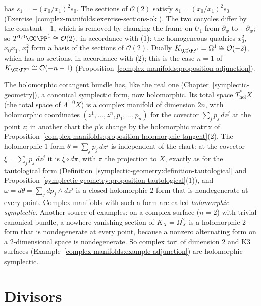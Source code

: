 \begin{example}
\begin{enumerate}
has $s_1 = -(x_0/x_1)^2s_0$. The sections of $\mathcal{O}(2)$ satisfy $s_1 = (x_0/x_1)^2s_0$ (Exercise~\ref{complex-manifolds:exercise-sections-ok}). The two cocycles differ by the constant $-1$, which is
removed by changing the frame on $U_1$ from $\partial_w$ to $-\partial_w$; so $T^{1,0}\CC\PP^1 \cong \mathcal{O}(2)$, in accordance with (1): the homogeneous quadrics $x_0^2$, $x_0x_1$, $x_1^2$ form a basis of
the sections of $\mathcal{O}(2)$. Dually $K_{\CC\PP^1} = \Omega^1 \cong \mathcal{O}(-2)$, which has no sections, in accordance with (2); this is the case $n = 1$ of $K_{\CC\PP^n} \cong \mathcal{O}(-n-1)$
(Proposition~\ref{complex-manifolds:proposition-adjunction}).
\end{enumerate}
\end{example}

\begin{remark}\label{complex-manifolds:remark-holomorphic-symplectic}
The holomorphic cotangent bundle has, like the real one (Chapter~\ref{symplectic-geometry}), a canonical symplectic form, now holomorphic. Its total space $T^*_{\mathrm{hol}}X$ (the total space of $\Lambda^{1,0}X$) is a complex
manifold of dimension $2n$, with holomorphic coordinates $(z^1, \ldots, z^n, p_1, \ldots, p_n)$ for the covector $\sum_jp_j\,dz^j$ at the point $z$; in another chart the $p$'s change by the holomorphic matrix of
Proposition~\ref{complex-manifolds:proposition-holomorphic-tangent}(2). The holomorphic $1$-form $\theta = \sum_jp_j\,dz^j$ is independent of the chart: at the covector $\xi = \sum_jp_j\,dz^j$ it is $\xi \circ d\pi$, with $\pi$ the
projection to $X$, exactly as for the tautological form (Definition~\ref{symplectic-geometry:definition-tautological} and Proposition~\ref{symplectic-geometry:proposition-tautological}(1)), and $\omega = d\theta = \sum_jdp_j \wedge dz^j$ is a closed holomorphic $2$-form that is nondegenerate at every point. Complex manifolds with such a form are
called \emph{holomorphic symplectic}. Another source of examples: on a complex surface ($n = 2$) with trivial canonical bundle, a nowhere vanishing section of $K_X = \Omega^2_X$ is a holomorphic $2$-form that is
nondegenerate at every point, because a nonzero alternating form on a $2$-dimensional space is nondegenerate. So complex tori of dimension $2$ and K3 surfaces (Example~\ref{complex-manifolds:example-adjunction}) are
holomorphic symplectic.
\end{remark}

\section{Divisors}\label{complex-manifolds:section-divisors}

